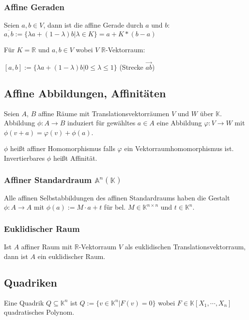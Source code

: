 \subsubsection*{Affine Geraden}

Seien $a, b \in V$, dann ist die affine Gerade durch $a$ und $b$: $\overline{a, b} := \{\lambda a + (1 - \lambda)b | \lambda \in K\} = a + K*(b-a)$

Für $K = \mathbb{R}$ und $a, b \in V$ wobei $V$ $\mathbb{R}$-Vektorraum:

$[a, b] := \{\lambda a + (1 - \lambda)b|0 \leq \lambda \leq 1\}$ (Strecke $\overrightarrow{ab}$)

\subsection*{Affine Abbildungen, Affinitäten}

Seien $A$, $B$ affine Räume mit Translationsvektorräumen $V$ und $W$ über $\mathbb{K}$. Abbildung $\phi : A \rightarrow B$ induziert für gewähltes $a \in A$ eine Abbildung $\varphi : V \rightarrow W$ mit $\phi(v+a) = \varphi(v) + \phi(a)$.

$\phi$ heißt affiner Homomorphismus falls $\varphi$ ein Vektorraumhomomorphismus ist. Invertierbares $\phi$ heißt Affinität.

\subsubsection*{Affiner Standardraum $\mathbb{A}^n(\mathbb{K})$}

Alle affinen Selbstabbildungen des affinen Standardraums haben die Gestalt $\phi : A \rightarrow A$ mit $\phi(a) := M \cdot a + t$ für bel. $M \in \mathbb{K}^{n\times n}$ und $t \in \mathbb{K}^n$.

\subsubsection*{Euklidischer Raum}

Ist $A$ affiner Raum mit $\mathbb{R}$-Vektorraum $V$ als euklidischen Translationsvektorraum, dann ist $A$ ein euklidischer Raum.

\subsection*{Quadriken}

Eine Quadrik $Q \subseteq \mathbb{K}^n$ ist $Q := \{ v \in \mathbb{K}^n | F(v) = 0 \}$ wobei $F \in \mathbb{K}[X_1, \cdots, X_n]$ quadratisches Polynom.

